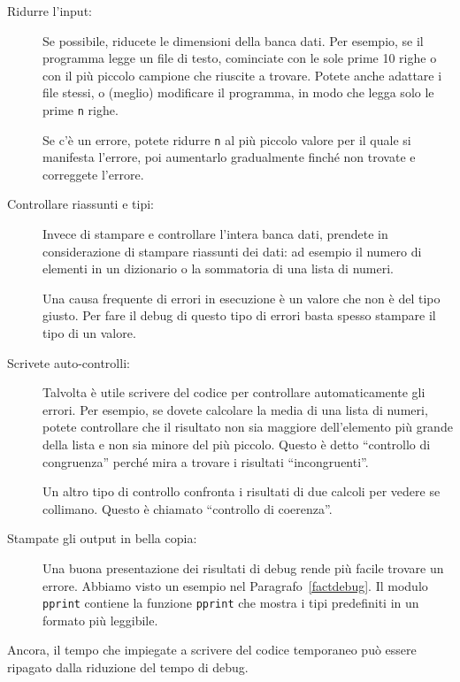 \documentclass[10pt]{book}
\begin{document}
\begin{description}

\item[Ridurre l'input:] Se possibile, riducete le dimensioni della banca dati. Per esempio, se il programma legge un file di testo, cominciate con le sole prime 10 righe o con il più piccolo campione che riuscite a trovare. Potete anche adattare i file stessi, o (meglio) modificare il programma, in modo che legga solo le prime {\tt n} righe.

Se c'è un errore, potete ridurre {\tt n} al più piccolo valore per il quale si manifesta l'errore, poi aumentarlo gradualmente finché non trovate e correggete l'errore.

\item[Controllare riassunti e tipi:] Invece di stampare e controllare l'intera banca dati, prendete in considerazione di stampare riassunti dei dati: ad esempio il numero di elementi in un dizionario o la sommatoria di una lista di numeri.

Una causa frequente di errori in esecuzione è un valore che non è del tipo giusto. Per fare il debug di questo tipo di errori basta spesso stampare il tipo di un valore.

\item[Scrivete auto-controlli:]  Talvolta è utile scrivere del codice per controllare automaticamente gli errori. Per esempio, se dovete calcolare la media di una lista di numeri, potete controllare che il risultato non sia maggiore dell'elemento più grande della lista e non sia minore del più piccolo. Questo è detto ``controllo di congruenza'' perché mira a trovare i risultati ``incongruenti''.

Un altro tipo di controllo confronta i risultati di due calcoli per vedere se collimano. Questo è chiamato ``controllo di coerenza''.

\item[Stampate gli output in bella copia:] Una buona presentazione dei risultati di debug rende più facile trovare un errore. Abbiamo visto un esempio nel Paragrafo~\ref{factdebug}.  Il modulo {\tt pprint} contiene la funzione {\tt pprint} che mostra i tipi predefiniti in un formato più leggibile.

\end{description}

Ancora, il tempo che impiegate a scrivere del codice temporaneo può essere ripagato dalla riduzione del tempo di debug.
\end{document}
